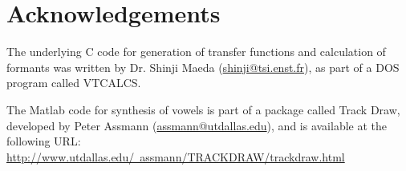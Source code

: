 \chapter{Acknowledgements}

The underlying C code for generation of transfer functions and
calculation of formants was written by Dr. Shinji Maeda
(\href{mailto:shinji@tsi.enst.fr}{shinji@tsi.enst.fr}), as part of
a DOS program called VTCALCS.

The Matlab code for synthesis of vowels is part of a package
called Track Draw, developed by Peter Assmann
(\href{mailto:assmann@utdallas.edu}{assmann@utdallas.edu}), and is
available at the following URL:
\href{http://www.utdallas.edu/~assmann/TRACKDRAW/trackdraw.html}
{http://www.utdallas.edu/~assmann/TRACKDRAW/trackdraw.html}
